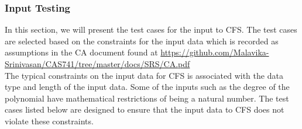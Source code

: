 \documentclass[12pt, titlepage]{article}
\newcommand{\famname}{CFS} %
\begin{document}
\subsubsection{Input Testing}\label{InputTesting}

In this section, we will present the test cases for the input to \famname{}. 
The test cases are selected based on the constraints for the input data 
which is recorded as assumptions in the CA document found at  \sloppy
\url{https://github.com/Malavika-Srinivasan/CAS741/tree/master/docs/SRS/CA.pdf} 
\\
The typical constraints on the input data for \famname{} is associated with the 
data type and length of the input data. Some of the inputs such as the degree 
of the polynomial have mathematical restrictions of being a natural number. The 
test cases listed below are designed to ensure that the input data to 
\famname{} does not violate these constraints.  

\end{document}
